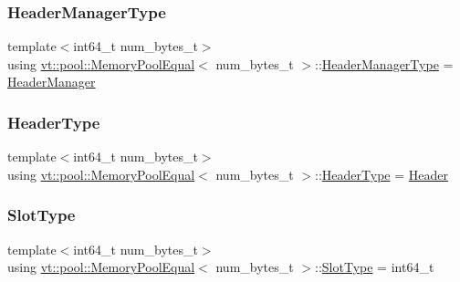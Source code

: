 \mbox{\label{structvt_1_1pool_1_1_memory_pool_equal_a43bf2b08808f0f90aa1fc1588c7ffd08}} 
\subsubsection{\texorpdfstring{Header\+Manager\+Type}{HeaderManagerType}}
{\footnotesize\ttfamily template$<$int64\+\_\+t num\+\_\+bytes\+\_\+t$>$ \\
using \hyperlink{structvt_1_1pool_1_1_memory_pool_equal}{vt\+::pool\+::\+Memory\+Pool\+Equal}$<$ num\+\_\+bytes\+\_\+t $>$\+::\hyperlink{structvt_1_1pool_1_1_memory_pool_equal_a43bf2b08808f0f90aa1fc1588c7ffd08}{Header\+Manager\+Type} =  \hyperlink{structvt_1_1pool_1_1_header_manager}{Header\+Manager}}

\mbox{\label{structvt_1_1pool_1_1_memory_pool_equal_a6b3a6a56431496ae69e1799c3d9856dc}} 
\subsubsection{\texorpdfstring{Header\+Type}{HeaderType}}
{\footnotesize\ttfamily template$<$int64\+\_\+t num\+\_\+bytes\+\_\+t$>$ \\
using \hyperlink{structvt_1_1pool_1_1_memory_pool_equal}{vt\+::pool\+::\+Memory\+Pool\+Equal}$<$ num\+\_\+bytes\+\_\+t $>$\+::\hyperlink{structvt_1_1pool_1_1_memory_pool_equal_a6b3a6a56431496ae69e1799c3d9856dc}{Header\+Type} =  \hyperlink{structvt_1_1pool_1_1_header}{Header}}

\mbox{\label{structvt_1_1pool_1_1_memory_pool_equal_a101fdcb943d0cb0863cf17655e0b4e1c}} 
\subsubsection{\texorpdfstring{Slot\+Type}{SlotType}}
{\footnotesize\ttfamily template$<$int64\+\_\+t num\+\_\+bytes\+\_\+t$>$ \\
using \hyperlink{structvt_1_1pool_1_1_memory_pool_equal}{vt\+::pool\+::\+Memory\+Pool\+Equal}$<$ num\+\_\+bytes\+\_\+t $>$\+::\hyperlink{structvt_1_1pool_1_1_memory_pool_equal_a101fdcb943d0cb0863cf17655e0b4e1c}{Slot\+Type} =  int64\+\_\+t}



